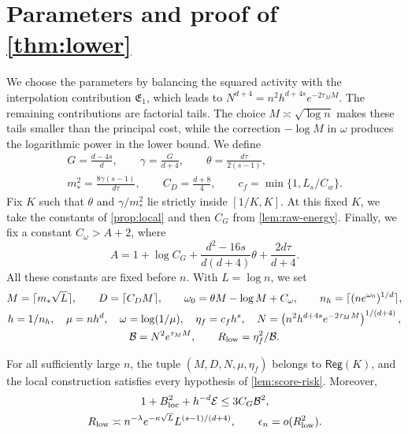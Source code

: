 \section{Parameters and proof of \texorpdfstring{\cref{thm:lower}}{Theorem 6.1}}\label{sec:LB-proof}

We choose the parameters by balancing the squared activity with the
interpolation contribution $\mathfrak E_1$, which leads to
$N^{d+4}=n^2h^{d+4s}e^{-2\tau_MM}$. The remaining contributions
are factorial tails. The choice $M\asymp\sqrt{\log n}$ makes these tails
smaller than the principal cost, while the correction $-\log M$ in
$\omega$ produces the logarithmic power in the lower bound. We define
\[
\begin{gathered}
 G=\frac{d-4s}{d},\qquad \gamma=\frac{G}{d+4},\qquad
 \theta=\frac{d\tau}{2(s-1)},\\
 m_*^2=\frac{8\gamma(s-1)}{d\tau},\qquad C_D=\frac{d+8}{4},
 \qquad c_f=\min\{1,L_s/C_w\}.
\end{gathered}
\]
Fix $K$ such that $\theta$ and $\gamma/m_*^2$ lie strictly inside
$[1/K,K]$. At this fixed $K$, we take the constants of \cref{prop:local}
and then $C_G$ from \cref{lem:raw-energy}. Finally, we fix a constant
$C_\omega>A+2$, where
\[
 A=1+\log C_G+\frac{d^2-16s}{d(d+4)}\theta+\frac{2d\tau}{d+4}.
\]
All these constants are fixed before $n$. With $L=\log n$, we set
\begin{equation}\label{eq:LB-parameters}
\begin{gathered}
 M=\lceil m_*\sqrt L\rceil,\qquad D=\lceil C_DM\rceil,\qquad
 \omega_0=\theta M-\log M+C_\omega,\qquad
 n_h=\lceil(ne^{\omega_0})^{1/d}\rceil,\\
 h=1/n_h,\quad\mu=nh^d,\quad\omega=\log(1/\mu),\quad
 \eta_f=c_fh^s,\quad
 N=\left(n^2h^{d+4s}e^{-2\tau_MM}\right)^{1/(d+4)},\\
 \mathcal B=N^2e^{\tau_MM},\qquad R_{\rm low}=\eta_f^2/\mathcal B.
\end{gathered}
\end{equation}

\begin{lemma}\label{lem:saddle}
For all sufficiently large $n$, the tuple
$(M,D,N,\mu,\eta_f)$ belongs to $\mathsf{Reg}(K)$, and the local
construction satisfies every hypothesis of \cref{lem:score-risk}.
Moreover,
\[
\begin{gathered}
 1+B_{\rm loc}^2+h^{-d}\mathcal E\le3C_G\mathcal B^2,\\
 R_{\rm low}\asymp n^{-\lambda}e^{-\kappa\sqrt L}L^{(s-1)/(d+4)},
 \qquad \epsilon_n=o(R_{\rm low}^2).
\end{gathered}
\]
\end{lemma}

